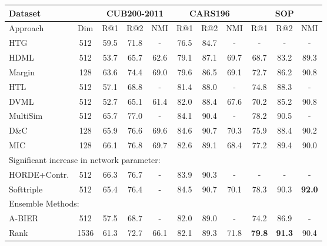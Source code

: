\documentclass[runningheads]{llncs}
\begin{document}
\begin{table*}[t]
    \setlength\tabcolsep{1.5pt}
    \centering
     \begin{tabular}{l|c|cc|c||cc|c||cc|c}
        \toprule
        Dataset  & & \multicolumn{3}{c}{CUB200-2011\cite{cub200-2011}} & \multicolumn{3}{c}{CARS196\cite{cars196}}
        & \multicolumn{3}{c}{SOP\cite{lifted}}\\ 
        \hline
        Approach  & Dim & R@1 & R@2 & NMI & R@1 & R@2 & NMI & R@1 & R@2 & NMI \\
        \midrule
        HTG\cite{htg}             & 512 & 59.5 & 71.8 & - & 76.5 & 84.7 & - & - & - & -\\
        HDML\cite{hardness-aware} & 512 & 53.7 & 65.7 & 62.6 & 79.1 & 87.1 & 69.7 & 68.7 & 83.2 & 89.3\\
        Margin\cite{margin}       & 128 & 63.6 & 74.4 & 69.0 & 79.6 & 86.5 & 69.1 & 72.7 & 86.2 & 90.8\\
        HTL\cite{htl}             & 512 & 57.1 & 68.8 & - & 81.4 & 88.0 & - & 74.8 & 88.3 & -\\
        DVML\cite{dvml}           & 512 & 52.7 & 65.1 & 61.4 & 82.0 & 88.4 & 67.6 & 70.2 & 85.2 & 90.8\\
        MultiSim\cite{multisimilarity}  & 512 & 65.7 & 77.0 & -    & 84.1 & 90.4 & -    & 78.2 & 90.5 & -   \\
        D\&C\cite{Sanakoyeu_2019_CVPR}  & 128 & 65.9 & 76.6 & 69.6 & 84.6 & 90.7 & 70.3 & 75.9 & 88.4 & 90.2\\
        MIC\cite{mic}             & 128 & 66.1 & 76.8 & 69.7 & 82.6 & 89.1 & 68.4 & 77.2 & 89.4 & 90.0\\        
        \hline
        \multicolumn{11}{l}{Significant increase in network parameter:} \\      
        \hline
        HORDE\cite{horde}+Contr.\cite{contrastive} & 512 & 66.3 & 76.7 & - & 83.9 & 90.3 & -    & -    & -    & -   \\
        Softtriple\cite{softriple}                 & 512 & 65.4 & 76.4 & - & 84.5 & 90.7 & 70.1 & 78.3 & 90.3 & \textbf{92.0}\\
        \hline
        \multicolumn{11}{l}{Ensemble Methods:} \\
        \hline
        A-BIER\cite{abier}    & 512 & 57.5 & 68.7 & - & 82.0 & 89.0 & - & 74.2 & 86.9 & -\\        
        Rank\cite{rankedlist} & 1536 & 61.3 & 72.7 & 66.1 & 82.1 & 89.3 & 71.8 & \textbf{79.8} & \textbf{91.3} & 90.4\\

\end{tabular}
\end{table*}
\end{document}
